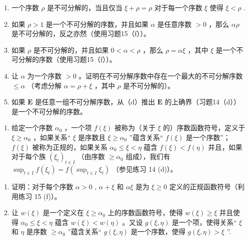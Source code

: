 \begin{enumerate}
\def\labelenumi{(\alph{enumi})}
\item
  一个序数 \(\rho\) 是不可分解的，当且仅当 \(\xi + \rho = \rho\) 对于每一个序数 \(\xi\) 使得 \(\xi < \rho\) .
\item
  如果 \(\rho > 1\) 是一个不可分解的序数，并且如果 \(\alpha\) 是任意序数 \(>0\) ，那么 \(\alpha\rho\) 是不可分解的，反之亦然（使用习题15（f））。
\item
  如果 \(\rho\) 是不可分解的，并且如果 \(0 < \alpha < \rho\) ，那么 \(\rho = \alpha\xi\) ，其中 \(\xi\) 是一个不可分解的序数（使用习题15（f））。
\item
  让 \(\alpha\) 为一个序数 \(>0\) 。证明在不可分解序数中存在一个最大的不可分解序数 \(\leqslant \alpha\) （考虑分解 \(\alpha = \rho + \xi\) ，其中 \(\rho\) 是不可分解的）。
\item
  如果 \(\mathbf{E}\) 是任意一组不可分解序数，从（d）推出 \(\mathbf{E}\) 的上确界（习题14（d））是一个不可分解的序数。
\end{enumerate}

\begin{enumerate}
\def\labelenumi{\arabic{enumi}.}
\setcounter{enumi}{16}
\tightlist
\item
  给定一个序数 \(\alpha_0\) ，一个项 \(f(\xi)\) 被称为（关于 \(\xi\) 的）序数函数符号，定义于 \(\xi \geqslant \alpha_0\) ，如果关系“ \(\xi\) 是序数且 \(\xi \geqslant \alpha_0\) ”蕴含关系“ \(f(\xi)\) 是一个序数”； \(f(\xi)\) 被称为正规的，如果关系 \(\alpha_0 \leqslant \xi < \eta\) 蕴含 \(f(\xi) < f(\eta)\) 并且，如果对于每个族 \((\xi_t)_{t \in I}\) （由序数 \(\geqslant \alpha_0\) 组成），我们有 \(\sup_{t \in I} f(\xi_t) = f(\sup_{t \in I} \xi_t)\) （参见练习 14 (d)）。
\end{enumerate}

\begin{enumerate}
\def\labelenumi{(\alph{enumi})}
\item
  证明：对于每个序数 \(\alpha > 0\) , \(\alpha + \xi\) 和 \(\alpha\xi\) 是为 \(\xi \geqslant 0\) 定义的正规函数符号（利用练习 15 (f)）。
\item
  让 \(w(\xi)\) 是一个定义在 \(\xi \geqslant \alpha_0\) 上的序数函数符号，使得 \(w(\xi) \geqslant \xi\) 并且使得 \(\alpha_0 \leqslant \xi < \eta\) 蕴含 \(w(\xi) < w(\eta)\) 。又设 \(g(\xi, \eta)\) 是一个项，使得关系“ \(\xi\) 和 \(\eta\) 是序数 \(\geqslant \alpha_0\) ”蕴含关系“ \(g(\xi, \eta)\) 是一个序数，使得 \(g(\xi, \eta) > \xi\) ''.
\end{enumerate}

